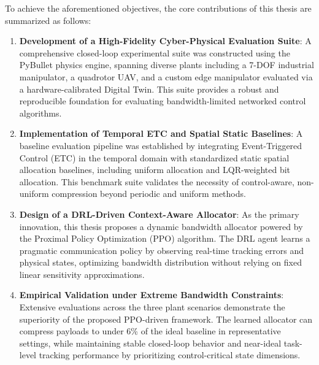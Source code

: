 To achieve the aforementioned objectives, the core contributions of this thesis are summarized as follows:
\begin{enumerate}
    \item \textbf{Development of a High-Fidelity Cyber-Physical Evaluation Suite}: A comprehensive closed-loop experimental suite was constructed using the PyBullet physics engine, spanning diverse plants including a 7-DOF industrial manipulator, a quadrotor UAV, and a custom edge manipulator evaluated via a hardware-calibrated Digital Twin. This suite provides a robust and reproducible foundation for evaluating bandwidth-limited networked control algorithms.
    \item \textbf{Implementation of Temporal ETC and Spatial Static Baselines}: A baseline evaluation pipeline was established by integrating Event-Triggered Control (ETC) in the temporal domain with standardized static spatial allocation baselines, including uniform allocation and LQR-weighted bit allocation. This benchmark suite validates the necessity of control-aware, non-uniform compression beyond periodic and uniform methods.
    \item \textbf{Design of a DRL-Driven Context-Aware Allocator}: As the primary innovation, this thesis proposes a dynamic bandwidth allocator powered by the Proximal Policy Optimization (PPO) algorithm. The DRL agent learns a pragmatic communication policy by observing real-time tracking errors and physical states, optimizing bandwidth distribution without relying on fixed linear sensitivity approximations.
    \item \textbf{Empirical Validation under Extreme Bandwidth Constraints}: Extensive evaluations across the three plant scenarios demonstrate the superiority of the proposed PPO-driven framework. The learned allocator can compress payloads to under 6\% of the ideal baseline in representative settings, while maintaining stable closed-loop behavior and near-ideal task-level tracking performance by prioritizing control-critical state dimensions.
\end{enumerate}
